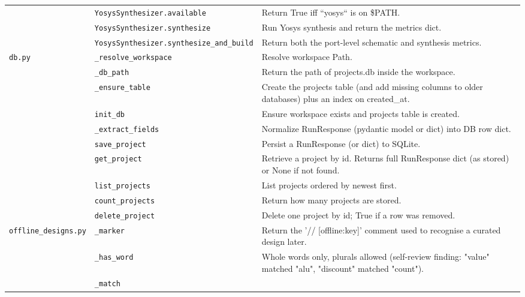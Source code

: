 \begin{longtable}{@{}p{2.8cm}>{\raggedright\arraybackslash}p{4.6cm}p{7.9cm}@{}}
{\small } & \texttt{\small YosysSynthesizer.\allowbreak available} & Return True iff ``yosys`` is on \$PATH. \\
{\small } & \texttt{\small YosysSynthesizer.\allowbreak synthesize} & Run Yosys synthesis and return the metrics dict. \\
{\small } & \texttt{\small YosysSynthesizer.\allowbreak synthesize\_\allowbreak{}and\_\allowbreak{}build} & Return both the port-level schematic and synthesis metrics. \\
{\small \nolinkurl{db.py}} & \texttt{\small \_\allowbreak{}resolve\_\allowbreak{}workspace} & Resolve workspace Path. \\
{\small } & \texttt{\small \_\allowbreak{}db\_\allowbreak{}path} & Return the path of projects.db inside the workspace. \\
{\small } & \texttt{\small \_\allowbreak{}ensure\_\allowbreak{}table} & Create the projects table (and add missing columns to older databases) plus an index on created\_at. \\
{\small } & \texttt{\small init\_\allowbreak{}db} & Ensure workspace exists and projects table is created. \\
{\small } & \texttt{\small \_\allowbreak{}extract\_\allowbreak{}fields} & Normalize RunResponse (pydantic model or dict) into DB row dict. \\
{\small } & \texttt{\small save\_\allowbreak{}project} & Persist a RunResponse (or dict) to SQLite. \\
{\small } & \texttt{\small get\_\allowbreak{}project} & Retrieve a project by id. Returns full RunResponse dict (as stored) or None if not found. \\
{\small } & \texttt{\small list\_\allowbreak{}projects} & List projects ordered by newest first. \\
{\small } & \texttt{\small count\_\allowbreak{}projects} & Return how many projects are stored. \\
{\small } & \texttt{\small delete\_\allowbreak{}project} & Delete one project by id; True if a row was removed. \\
{\small \nolinkurl{offline_designs.py}} & \texttt{\small \_\allowbreak{}marker} & Return the '// [offline:key]' comment used to recognise a curated design later. \\
{\small } & \texttt{\small \_\allowbreak{}has\_\allowbreak{}word} & Whole words only, plurals allowed (self-review finding: "value" matched "alu", "discount" matched "count"). \\
{\small } & \texttt{\small \_\allowbreak{}match} &  \\

\end{longtable}
